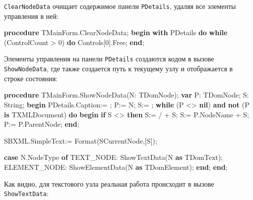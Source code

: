 \documentclass[
]{article}
\newenvironment{Shaded}{}{}
\newcommand{\DataTypeTok}[1]{\textcolor[rgb]{0.56,0.13,0.00}{#1}}
\newcommand{\DecValTok}[1]{\textcolor[rgb]{0.25,0.63,0.44}{#1}}
\newcommand{\KeywordTok}[1]{\textcolor[rgb]{0.00,0.44,0.13}{\textbf{#1}}}
\newcommand{\NormalTok}[1]{#1}
\newcommand{\StringTok}[1]{\textcolor[rgb]{0.25,0.44,0.63}{#1}}
\begin{document}
\texttt{ClearNodeData} очищает содержимое панели \texttt{PDetails},
удаляя все элементы управления в ней:

\begin{Shaded}
\begin{Highlighting}[]
\KeywordTok{procedure}\NormalTok{ TMainForm.ClearNodeData;}
\KeywordTok{begin}
  \KeywordTok{with}\NormalTok{ PDetails }\KeywordTok{do}
    \KeywordTok{while}\NormalTok{ (ControlCount \textgreater{} }\DecValTok{0}\NormalTok{) }\KeywordTok{do}\NormalTok{ Controls[}\DecValTok{0}\NormalTok{].Free;}
\KeywordTok{end}\NormalTok{;}
\end{Highlighting}
\end{Shaded}

Элементы управления на панели \texttt{PDetails} создаются кодом в вызове
\texttt{ShowNodeData}, где также создается путь к текущему узлу и
отображается в строке состояния:

\begin{Shaded}
\begin{Highlighting}[]
\KeywordTok{procedure}\NormalTok{ TMainForm.ShowNodeData(N: TDomNode);}
\KeywordTok{var}
\NormalTok{  P: TDomNode;}
\NormalTok{  S: }\DataTypeTok{String}\NormalTok{;}
\KeywordTok{begin}
\NormalTok{  PDetails.Caption:= }\StringTok{\textquotesingle{}\textquotesingle{}}\NormalTok{;}
\NormalTok{  P:= N;}
\NormalTok{  S:= }\StringTok{\textquotesingle{}\textquotesingle{}}\NormalTok{;}
  \KeywordTok{while}\NormalTok{ (P \textless{}\textgreater{} }\KeywordTok{nil}\NormalTok{) }\KeywordTok{and} \KeywordTok{not}\NormalTok{ (P }\KeywordTok{is}\NormalTok{ TXMLDocument) }\KeywordTok{do}
  \KeywordTok{begin}
    \KeywordTok{if}\NormalTok{ S \textless{}\textgreater{} }\StringTok{\textquotesingle{}\textquotesingle{}} \KeywordTok{then}\NormalTok{ S:= }\StringTok{\textquotesingle{}/\textquotesingle{}}\NormalTok{ + S;}
\NormalTok{    S:= P.NodeName + S;}
\NormalTok{    P:= P.ParentNode;}
  \KeywordTok{end}\NormalTok{;}

\NormalTok{  SBXML.SimpleText:= Format(SCurrentNode,[S]);}

  \KeywordTok{case}\NormalTok{ N.NodeType }\KeywordTok{of}
\NormalTok{       TEXT\_NODE: ShowTextData(N }\KeywordTok{as}\NormalTok{ TDomText);}
\NormalTok{    ELEMENT\_NODE: ShowElementData(N }\KeywordTok{as}\NormalTok{ TDomElement);}
  \KeywordTok{end}\NormalTok{;}
\KeywordTok{end}\NormalTok{;}
\end{Highlighting}
\end{Shaded}

Как видно, для текстового узла реальная работа происходит в вызове
\texttt{ShowTextData}:
\end{document}
